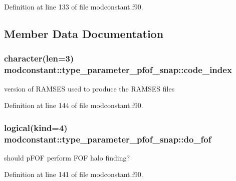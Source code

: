 Definition at line 133 of file modconstant.\-f90.



\subsection{Member Data Documentation}
\hypertarget{structmodconstant_1_1type__parameter__pfof__snap_a08a341a76feda6a632e6ff16050c7e3e}{
\subsubsection[{code\-\_\-index}]{\setlength{\rightskip}{0pt plus 5cm}character(len=3) modconstant\-::type\-\_\-parameter\-\_\-pfof\-\_\-snap\-::code\-\_\-index}}\label{structmodconstant_1_1type__parameter__pfof__snap_a08a341a76feda6a632e6ff16050c7e3e}


version of R\-A\-M\-S\-E\-S used to produce the R\-A\-M\-S\-E\-S files 



Definition at line 144 of file modconstant.\-f90.

\hypertarget{structmodconstant_1_1type__parameter__pfof__snap_acb40ca8aaf934ee56cf5233d3bca0be0}{
\subsubsection[{do\-\_\-fof}]{\setlength{\rightskip}{0pt plus 5cm}logical(kind=4) modconstant\-::type\-\_\-parameter\-\_\-pfof\-\_\-snap\-::do\-\_\-fof}}\label{structmodconstant_1_1type__parameter__pfof__snap_acb40ca8aaf934ee56cf5233d3bca0be0}


should p\-F\-O\-F perform F\-O\-F halo finding? 



Definition at line 141 of file modconstant.\-f90.

